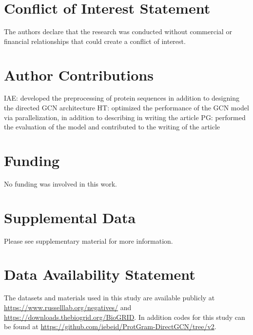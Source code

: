 \documentclass[utf8]{article}
\begin{document}
	\section*{Conflict of Interest Statement}
	The authors declare that the research was conducted without commercial or financial relationships that could create a conflict of interest.
	
	\section*{Author Contributions}
	IAE: developed the preprocessing of protein sequences in addition to designing the directed GCN architecture
	HT: optimized the performance of the GCN model via parallelization, in addition to describing in writing the article
	PG: performed the evaluation of the model and contributed to the writing of the article  
	
	\section*{Funding}
	No funding was involved in this work.
	
	
	\section*{Supplemental Data}
	Please see supplementary material for more information.
	
	\section*{Data Availability Statement}
	The datasets and materials used in this study are available publicly at \url{https://www.russelllab.org/negatives/} and \url{https://downloads.thebiogrid.org/BioGRID}. In addition codes for this study can be found at \url{https://github.com/iebeid/ProtGram-DirectGCN/tree/v2}.
	
	
	
	
	
	
\end{document}
